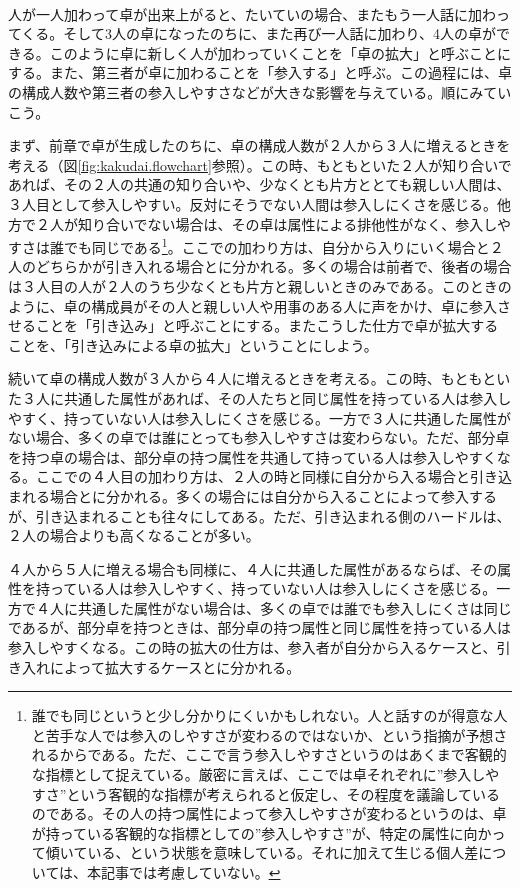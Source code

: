 \begin{multicols}{2}
\\
人が一人加わって卓が出来上がると、たいていの場合、またもう一人話に加わってくる。そして3人の卓になったのちに、また再び一人話に加わり、4人の卓ができる。このように卓に新しく人が加わっていくことを「卓の拡大」と呼ぶことにする。また、第三者が卓に加わることを「参入する」と呼ぶ。この過程には、卓の構成人数や第三者の参入しやすさなどが大きな影響を与えている。順にみていこう。
\par
まず、前章で卓が生成したのちに、卓の構成人数が２人から３人に増えるときを考える（図\ref{fig:kakudai.flowchart}参照）。この時、もともといた２人が知り合いであれば、その２人の共通の知り合いや、少なくとも片方ととても親しい人間は、３人目として参入しやすい。反対にそうでない人間は参入しにくさを感じる。他方で２人が知り合いでない場合は、その卓は属性による排他性がなく、参入しやすさは誰でも同じである\footnote{誰でも同じというと少し分かりにくいかもしれない。人と話すのが得意な人と苦手な人では参入のしやすさが変わるのではないか、という指摘が予想されるからである。ただ、ここで言う参入しやすさというのはあくまで客観的な指標として捉えている。厳密に言えば、ここでは卓それぞれに”参入しやすさ”という客観的な指標が考えられると仮定し、その程度を議論しているのである。その人の持つ属性によって参入しやすさが変わるというのは、卓が持っている客観的な指標としての”参入しやすさ”が、特定の属性に向かって傾いている、という状態を意味している。それに加えて生じる個人差については、本記事では考慮していない。}。ここでの加わり方は、自分から入りにいく場合と２人のどちらかが引き入れる場合とに分かれる。多くの場合は前者で、後者の場合は３人目の人が２人のうち少なくとも片方と親しいときのみである。このときのように、卓の構成員がその人と親しい人や用事のある人に声をかけ、卓に参入させることを「引き込み」と呼ぶことにする。またこうした仕方で卓が拡大することを、「引き込みによる卓の拡大」ということにしよう。
\par
続いて卓の構成人数が３人から４人に増えるときを考える。この時、もともといた３人に共通した属性があれば、その人たちと同じ属性を持っている人は参入しやすく、持っていない人は参入しにくさを感じる。一方で３人に共通した属性がない場合、多くの卓では誰にとっても参入しやすさは変わらない。ただ、部分卓を持つ卓の場合は、部分卓の持つ属性を共通して持っている人は参入しやすくなる。ここでの４人目の加わり方は、２人の時と同様に自分から入る場合と引き込まれる場合とに分かれる。多くの場合には自分から入ることによって参入するが、引き込まれることも往々にしてある。ただ、引き込まれる側のハードルは、２人の場合よりも高くなることが多い。
\par
４人から５人に増える場合も同様に、４人に共通した属性があるならば、その属性を持っている人は参入しやすく、持っていない人は参入しにくさを感じる。一方で４人に共通した属性がない場合は、多くの卓では誰でも参入しにくさは同じであるが、部分卓を持つときは、部分卓の持つ属性と同じ属性を持っている人は参入しやすくなる。この時の拡大の仕方は、参入者が自分から入るケースと、引き入れによって拡大するケースとに分かれる。

\end{multicols}
